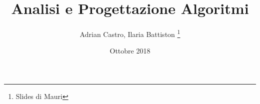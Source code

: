 \documentclass{article}
\title{Analisi e Progettazione Algoritmi}
\author{Adrian Castro, Ilaria Battiston \thanks{Slides di Mauri}}
\date{Ottobre 2018}
\begin{document}
\maketitle

\lfoot{}
\cfoot{}
\rfoot{\thepage}

\newpage
\tableofcontents
\newpage










%





%
%
\end{document}
